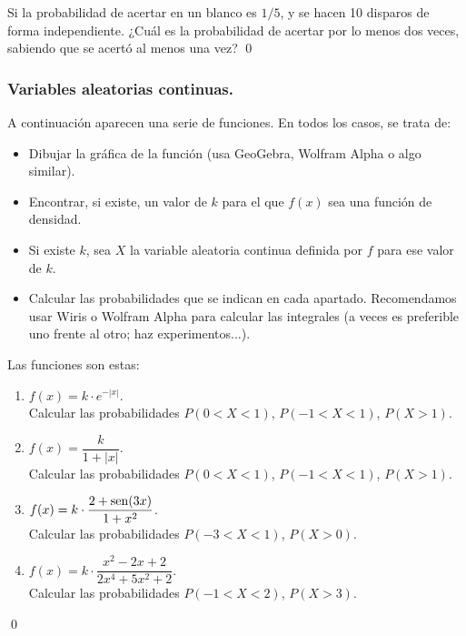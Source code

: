 \documentclass[10pt,a4paper]{article}\usepackage[]{graphicx}\usepackage[]{color}
\newcounter{cont01}
\begin{document}
\begin{ejercicio}
\label{tut05:ejercicio35}

Si la probabilidad de acertar en un blanco es $1/5$, y se hacen  10 disparos de forma independiente. ¿Cuál es la probabilidad de  acertar por lo menos dos veces, sabiendo que se acertó al menos una vez?
\qed\end{ejercicio}


\subsubsection*{Variables aleatorias continuas.}

\begin{ejercicio}
\label{tut05:ejercicio36}

A continuación aparecen una serie de funciones. En todos los casos, se trata de:
\begin{itemize}
    \item Dibujar la gráfica de la función (usa GeoGebra, Wolfram Alpha o algo similar).
    \item Encontrar, si existe, un valor de $k$ para el que $f(x)$ sea una función de densidad.
    \item Si existe $k$, sea $X$ la variable aleatoria continua definida por $f$ para ese valor de
		 	$k$.
    \item Calcular las probabilidades que se indican en cada apartado. Recomendamos usar Wiris o 				Wolfram Alpha para calcular las integrales (a veces es preferible uno frente al otro; haz experimentos...).
\end{itemize}
Las funciones son estas:
\begin{enumerate}
    \item $f(x)=k\cdot e^{-|x|}$.\\
		Calcular las probabilidades $P(0<X<1)$, $P(-1<X<1)$, $P(X>1)$.
    \item $f(x)=\dfrac{k}{1+|x|}$.\\
		Calcular las probabilidades $P(0<X<1)$, $P(-1<X<1)$, $P(X>1)$.
		
    \item $f(x)=k\cdot \dfrac{2+\operatorname{sen}(3x)}{1 + x^2}$.\\		
		Calcular las probabilidades $P(-3<X<1)$, $P(X>0)$.

    \item $f(x)=k\cdot\dfrac{x^2-2x+2}{2 x^4+ 5 x^2+2}$.\\
		Calcular las probabilidades $P(-1<X<2)$, $P(X>3)$.
	\end{enumerate}


\qed\end{ejercicio}
\end{document}
